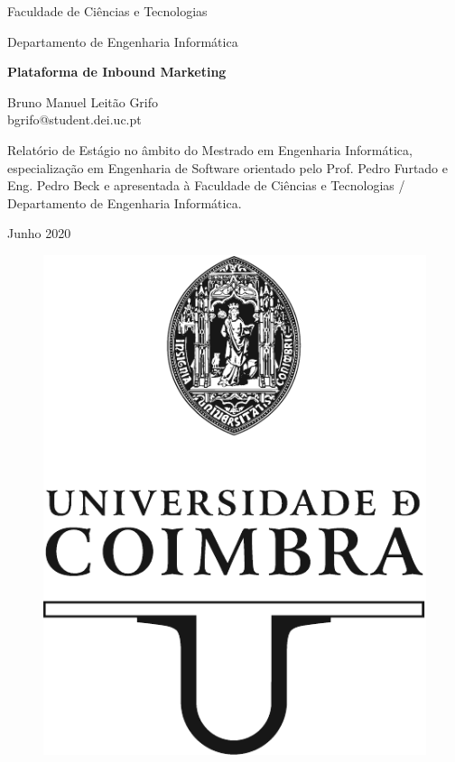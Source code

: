 

\begin{titlepage}
 

\begin{center}
\Large
Faculdade de Ciências e Tecnologias

Departamento de Engenharia Informática
\vspace{1cm}

\Huge
\textbf{\textup{\textsf{Plataforma de Inbound Marketing}}}

\LARGE

\textsf{}

\vspace{3cm}

\Large
Bruno Manuel Leitão Grifo \\
bgrifo@student.dei.uc.pt

\vspace{3cm}

\normalsize

Relatório de Estágio no âmbito do Mestrado em Engenharia Informática, especialização em Engenharia de Software orientado pelo Prof. Pedro Furtado e Eng. Pedro Beck e apresentada à Faculdade de Ciências e Tecnologias / Departamento de Engenharia Informática.


\vspace{0.5cm}

Junho 2020

\begin{figure}[b]
	\begin{center}
	\includegraphics[width=0.3\linewidth]{images/_UC_logo.pdf}
	\label{fig:Logo}	
	\end{center}
\end{figure}


\end{center}


\end{titlepage}
\restoregeometry
